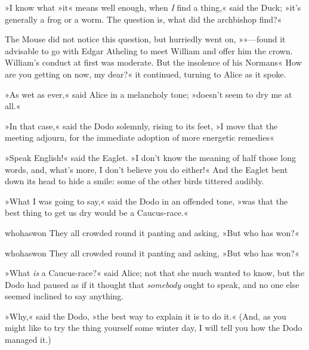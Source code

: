 »I know what »it« means well enough, when \textit{I} find a thing,« said the Duck; »it's generally a frog or a worm. The question is, what did the archbishop find?«

The Mouse did not notice this question, but hurriedly went on, »»—found it advisable to go with Edgar Atheling to meet William and offer him the crown. William's conduct at first was moderate. But the insolence of his Normans\longdash« How are you getting on now, my dear?« it continued, turning to Alice as it spoke.

»As wet as ever,« said Alice in a melancholy tone; »doesn't seem to dry me at all.«

»In that case,« said the Dodo solemnly, rising to its feet, »I move that the meeting adjourn, for the immediate adoption of more energetic remedies\longdash«

»Speak English!« said the Eaglet. »I don't know the meaning of half those long words, and, what's more, I don't believe you do either!« And the Eaglet bent down its head to hide a smile: some of the other birds tittered audibly.

»What I was going to say,« said the Dodo in an offended tone, »was that the best thing to get us dry would be a Caucus-race.«

\begin{pictures}
	\begin{letter}
		\begin{colorbigpic}
			[1.1]
			{whohaswon}
			{They all crowded round it panting and asking, »But who has won?«}
		\end{colorbigpic}
	\end{letter}
	
	\begin{a4}
		\begin{colorbigpic}
			[1.0]
			{whohaswon}
			{They all crowded round it panting and asking, »But who has won?«}
		\end{colorbigpic}
	\end{a4}	
\end{pictures}


»What \textit{is} a Caucus-race?« said Alice; not that she much wanted to know, but the Dodo had paused as if it thought that \textit{somebody} ought to speak, and no one else seemed inclined to say anything.

»Why,« said the Dodo, »the best way to explain it is to do it.« (And, as you might like to try the thing yourself some winter day, I will tell you how the Dodo managed it.)

